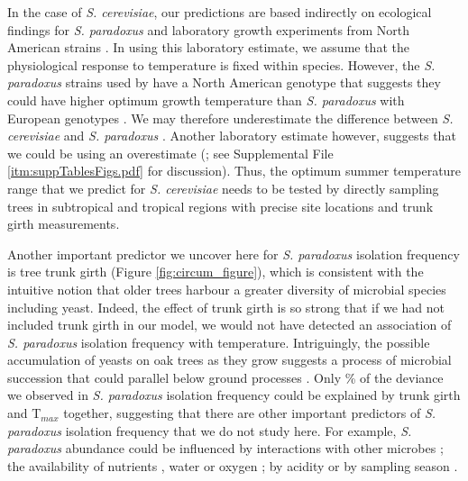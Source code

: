\documentclass[12pt]{article}
\begin{document}
\begin{linenumbers}
In the case of \textit{S. cerevisiae}, our predictions are based indirectly on ecological findings for \textit{S. paradoxus} and laboratory growth experiments from North American strains \citep{sweeney_sympatric_2004}. In using this laboratory estimate, we assume that the physiological response to temperature is fixed within species. However, the \textit{S. paradoxus} strains used by \citet{sweeney_sympatric_2004} have a North American genotype \citep{kuehne_allopatric_2007} that suggests they could have higher optimum growth temperature than \textit{S. paradoxus} with European genotypes \citep{leducq_local_2014,leducq_speciation_2015}. We may therefore underestimate the difference between \textit{S. cerevisiae} and \textit{S. paradoxus} \citep{leducq_local_2014}. Another laboratory estimate however, suggests that we could be using an overestimate (\citealp{salvado_temperature_2011}; see Supplemental File \ref{itm:suppTablesFigs.pdf} for discussion). Thus, the optimum summer temperature range that we predict for \textit{S. cerevisiae} needs to be tested by directly sampling trees in subtropical and tropical regions with precise site locations and trunk girth measurements. 

Another important predictor we uncover here for \textit{S. paradoxus} isolation frequency is tree trunk girth (Figure \ref{fig:circum_figure}), which is consistent with the intuitive notion that older trees harbour a greater diversity of microbial species including yeast. Indeed, the effect of trunk girth is so strong that if we had not included trunk girth in our model, we would not have detected an association of \textit{S. paradoxus} isolation frequency with temperature. Intriguingly, the possible accumulation of yeasts on oak trees as they grow suggests a process of microbial succession that could parallel below ground processes \citep{bardgett_temporal_2005,bardgett_biology_2005}. Only \finalpcentdev\% of the deviance we observed in \textit{S. paradoxus} isolation frequency could be explained by trunk girth and T$_{max}$ together, suggesting that there are other important predictors of \textit{S. paradoxus} isolation frequency that we do not study here. For example, \textit{S. paradoxus} abundance could be influenced by interactions with other microbes \citep{kowallik_interaction_2015}; the availability of nutrients \citep{sampaio_natural_2008}, water or oxygen \citep{deak_environmental_2006}; by acidity \citep{deak_environmental_2006} or by sampling season \citep{glushakova_massive_2007,charron_exploring_2014}.


\end{linenumbers}
\end{document}
